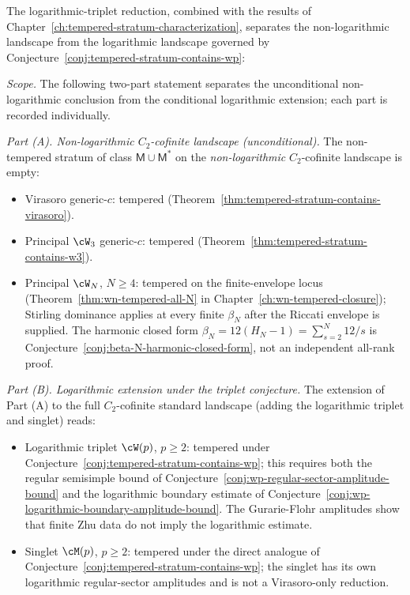 The logarithmic-triplet reduction, combined with the
results of Chapter~\ref{ch:tempered-stratum-characterization},
separates the non-logarithmic landscape from the logarithmic landscape
governed by Conjecture~\ref{conj:tempered-stratum-contains-wp}:

\begin{corollary}
\label{cor:wp-dichotomy-healed}
\emph{Scope.} The following two-part statement separates the
unconditional non-logarithmic conclusion from the conditional
logarithmic extension; each part is recorded
individually.

\emph{Part (A). Non-logarithmic $C_2$-cofinite landscape
(unconditional).}
The non-tempered stratum of class $\mathsf{M} \cup \mathsf{M}^*$ on
the \emph{non-logarithmic} $C_2$-cofinite landscape is empty:
\begin{itemize}[nosep]
\item Virasoro generic-$c$: tempered
 (Theorem~\ref{thm:tempered-stratum-contains-virasoro}).
\item Principal $\cW_3$ generic-$c$: tempered
 (Theorem~\ref{thm:tempered-stratum-contains-w3}).
\item Principal $\cW_N$, $N \ge 4$: tempered on the finite-envelope
 locus
 (Theorem~\ref{thm:wn-tempered-all-N} in
 Chapter~\ref{ch:wn-tempered-closure}); Stirling dominance applies at
 every finite $\beta_N$ after the Riccati envelope is supplied. The
 harmonic closed form
 $\beta_N = 12(H_N - 1) = \sum_{s=2}^{N} 12/s$ is
 Conjecture~\ref{conj:beta-N-harmonic-closed-form}, not an
 independent all-rank proof.
\end{itemize}

\emph{Part (B). Logarithmic extension under the triplet conjecture.}
The extension of Part (A) to the full $C_2$-cofinite standard
landscape (adding the logarithmic triplet and singlet) reads:
\begin{itemize}[nosep]
\item Logarithmic triplet $\cW(p)$, $p \ge 2$: tempered under
 Conjecture~\ref{conj:tempered-stratum-contains-wp}; this requires
 both the regular semisimple bound of
 Conjecture~\ref{conj:wp-regular-sector-amplitude-bound} and the
 logarithmic boundary estimate of
 Conjecture~\ref{conj:wp-logarithmic-boundary-amplitude-bound}. The
 Gurarie-Flohr amplitudes show that finite Zhu data do not imply the
 logarithmic estimate.
\item Singlet $\cM(p)$, $p \ge 2$: tempered under the direct
 analogue of Conjecture~\ref{conj:tempered-stratum-contains-wp}; the
 singlet has its own logarithmic regular-sector amplitudes and is not
 a Virasoro-only reduction.
\end{itemize}


\end{corollary}
